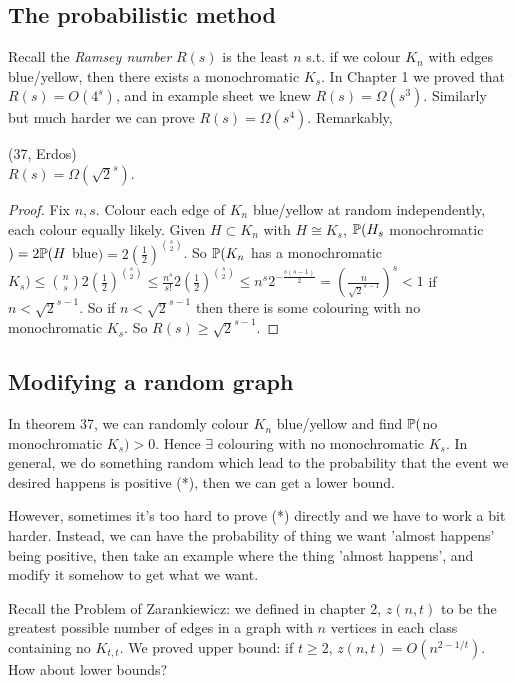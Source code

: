 \documentclass[a4paper]{article}
\begin{document}
\subsection{The probabilistic method}
Recall the \emph{Ramsey number} $R(s)$ is the least $n$ s.t. if we colour $K_n$ with edges blue/yellow, then there exists a monochromatic $K_s$. In Chapter 1 we proved that $R(s) = O(4^s)$, and in example sheet we knew $R(s) = \Omega(s^3)$. Similarly but much harder we can prove $R(s) = \Omega(s^4)$. Remarkably,

\begin{thm} (37, Erdos)\\
$R(s) = \Omega(\sqrt{2}^s)$.
\begin{proof}
Fix $n,s$. Colour each edge of $K_n$ blue/yellow at random independently, each colour equally likely. Given $H \subset K_n$ with $H \cong K_s$, $\P(H_s$ monochromatic$) = 2\P( H$ blue$) = 2(\frac{1}{2})^{s \choose 2}$. So $\P(K_n$ has a monochromatic $K_s) \leq {n \choose s} 2 (\frac{1}{2})^{s \choose 2} \leq \frac{n^s}{s!} 2 (\frac{1}{2})^{s \choose 2} \leq n^s 2^{-\frac{s(s-1)}{2}} = (\frac{n}{\sqrt{2}^{s-1}})^s < 1$ if $n < \sqrt{2}^{s-1}$. So if $n < \sqrt{2}^{s-1}$ then there is some colouring with no monochromatic $K_s$. So $R(s) \geq \sqrt{2}^{s-1}$.
\end{proof}
\end{thm}

\subsection{Modifying a random graph}
In theorem 37, we can randomly colour $K_n$ blue/yellow and find $\P($no monochromatic $K_s)>0$. Hence $\exists$ colouring with no monochromatic $K_s$. In general, we do something random which lead to the probability that the event we desired happens is positive (*), then we can get a lower bound.

However, sometimes it's too hard to prove (*) directly and we have to work a bit harder. Instead, we can have the probability of thing we want 'almost happens' being positive, then take an example where the thing 'almost happens', and modify it somehow to get what we want.

Recall the Problem of Zarankiewicz: we defined in chapter 2, $z(n,t)$ to be the greatest possible number of edges in a graph with $n$ vertices in each class containing no $K_{t,t}$. We proved upper bound: if $t \geq 2$, $z(n,t) = O(n^{2-1/t})$. How about lower bounds?
\end{document}
